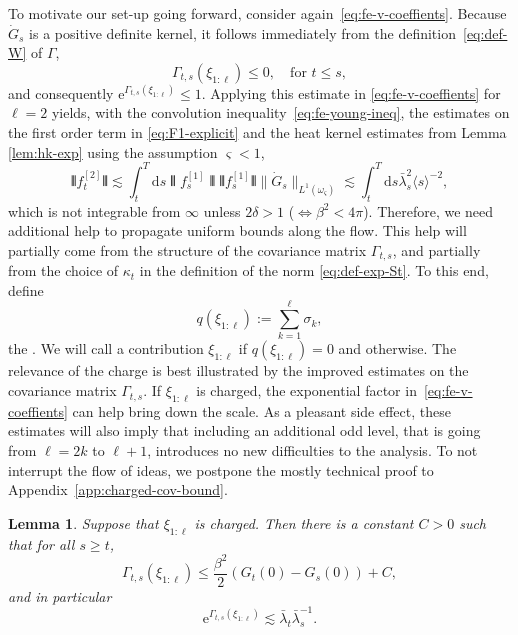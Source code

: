 \documentclass[11pt, a4paper]{scrartcl}
\numberwithin{equation}{section}
\theoremstyle{plain}
\newtheorem{lemma}[foo]{Lemma}
\theoremstyle{remark}
\newcommand{\assign}{:=}
\newcommand{\mathd}{\mathrm{d}}
\newcommand{\mathe}{\mathrm{e}}
\newcommand{\tmtextit}[1]{\text{{\itshape{#1}}}}
\begin{document}
To motivate our set-up going forward, consider
again~\eqref{eq:fe-v-coeffients}. Because $\dot{G}_s$ is a positive definite
kernel, it follows immediately from the definition~\eqref{eq:def-W} of $\Gamma$,
\begin{equation}
	\Gamma_{t, s} (\xi_{1 : \ell}) \leqslant 0 \label{eq:W-leq-0}, \quad \text{for }
	t \leqslant s,
\end{equation}
and consequently $\mathe^{\Gamma_{t, s} (\xi_{1 : \ell})} \leqslant 1$. Applying
this estimate in \eqref{eq:fe-v-coeffients} for $\ell = 2$ yields, with the
convolution inequality~\eqref{eq:fe-young-ineq}, the estimates on the first
order term in \eqref{eq:F1-explicit} and the heat kernel estimates from Lemma
\ref{lem:hk-exp} using the assumption $\varsigma < 1$,
\[ \interleave f^{[2]}_t \interleave \lesssim \int_t^T \mathd s \interleave
	f_s^{[1]} \interleave  \interleave f_s^{[1]} \interleave  \| \dot{G}_s
	\|_{L^1 (\omega_{\varsigma})} \lesssim \int_t^T \mathd s \bar{\lambda}_s^2
	\langle s \rangle^{- 2}, \]
which is not integrable from $\infty$ unless $2 \delta > 1$ ($\Leftrightarrow
	\beta^2 < 4 \pi$). Therefore, we need additional help to propagate uniform
bounds along the flow. This help will partially come from the structure of the
covariance matrix $\Gamma_{t, s}$, and partially from the choice of $\kappa_t$ in the
definition of the norm \eqref{eq:def-exp-St}. To this end, define
\[ q (\xi_{1 : \ell}) \assign \sum^{\ell}_{k = 1} \sigma_k, \]
the \tmtextit{charge of $\xi_{1 : \ell}$}. We will call a contribution $\xi_{1
		: \ell}$ \tmtextit{neutral} if $q (\xi_{1 : \ell}) = 0$ and \tmtextit{charged}
otherwise. The relevance of the charge is best illustrated by the improved
estimates on the covariance matrix $\Gamma_{t, s}$. If $\xi_{1 : \ell}$ is
charged, the exponential factor in~\eqref{eq:fe-v-coeffients} can help bring
down the scale. As a pleasant side effect, these estimates will also imply
that including an additional odd level, that is going from $\ell = 2 k$ to
$\ell + 1$, introduces no new difficulties to the analysis. To not
interrupt the flow of ideas, we postpone the mostly technical proof to
Appendix~\ref{app:charged-cov-bound}.

\begin{lemma}
	\label{lem:charged-cov-bound} Suppose that $\xi_{1 : \ell}$ is charged. Then
	there is a constant $C > 0$ such that for all $s \geqslant t$,
	\begin{equation}
		\Gamma_{t, s} (\xi_{1 : \ell}) \leqslant \frac{\beta^2}{2} (G_t (0) - G_s
		(0)) + C \label{eq:charged-cov-bound},
	\end{equation}
	and in particular
	\[ \mathe^{\Gamma_{t, s} (\xi_{1 : \ell})} \lesssim \bar{\lambda}_t \bar{\lambda}_s^{- 1} .
	\]
\end{lemma}
\end{document}
